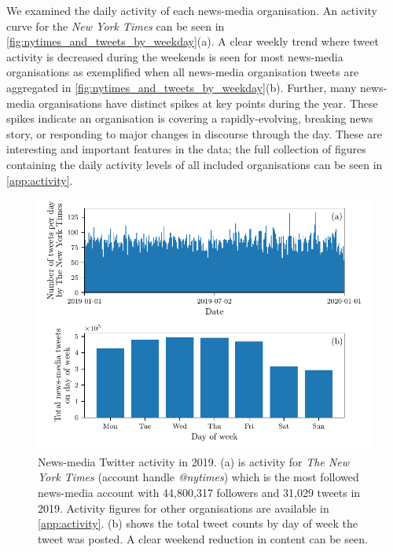 We examined the daily activity of each news-media organisation. An activity curve for the \emph{New York Times} can be seen in \autoref{fig:nytimes_and_tweets_by_weekday}(a). 
A clear weekly trend where tweet activity is decreased during the weekends is seen for most news-media organisations as exemplified when all news-media organisation tweets are aggregated in \autoref{fig:nytimes_and_tweets_by_weekday}(b). Further, many news-media organisations have distinct spikes at key points during the year. These spikes indicate an organisation is covering a rapidly-evolving, breaking news story, or responding to major changes in discourse through the day. These are interesting and important features in the data; the full collection of figures containing the daily activity levels of all included organisations can be seen in \autoref{app:activity}.

\begin{figure}[!htbp]
	\centering
	\includegraphics{chapter1/figs/nytimes_day_of_week_merge.pdf}
	\caption{News-media Twitter activity in 2019. (a) is activity for \emph{The New York Times} (account handle \emph{@nytimes}) which is the most followed news-media account with 44,800,317 followers and 31,029 tweets in 2019. Activity figures for other organisations are available in \autoref{app:activity}. (b) shows the total tweet counts by day of week the tweet was posted. A clear weekend reduction in content can be seen.}\label{fig:nytimes_and_tweets_by_weekday}
\end{figure}

